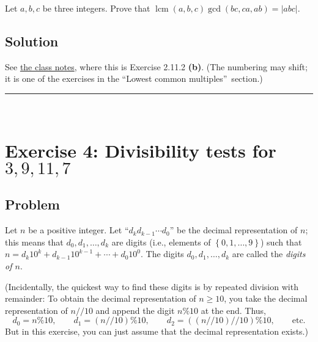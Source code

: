 \documentclass[paper=a4, fontsize=12pt]{scrartcl}%
\theoremstyle{plainsl}
\theoremstyle{definition}
\theoremstyle{remark}
\begin{document}
Let $a, b, c$ be three integers. Prove that $\operatorname{lcm}\left(  a, b, c
\right)  \gcd\left(  bc, ca, ab \right)  = \left|  abc \right|  $.

\subsection{Solution}

See \href{http://www.cip.ifi.lmu.de/~grinberg/t/19s/notes.pdf}{the class
notes}, where this is Exercise 2.11.2 \textbf{(b)}. (The numbering may shift;
it is one of the exercises in the \textquotedblleft Lowest common
multiples\textquotedblright\ section.)

\rule{\linewidth}{0.3pt} \\[0.4cm]

\section{Exercise 4: Divisibility tests for $3, 9, 11, 7$}

\subsection{Problem}

Let $n$ be a positive integer. Let ``$d_{k} d_{k-1} \cdots d_{0}$'' be the
decimal representation of $n$; this means that $d_{0}, d_{1}, \ldots, d_{k}$
are digits (i.e., elements of $\left\{  0, 1, \ldots, 9 \right\}  $) such that
$n = d_{k} 10^{k} + d_{k-1} 10^{k-1} + \cdots+ d_{0} 10^{0}$. The digits
$d_{0}, d_{1}, \ldots, d_{k}$ are called the \textit{digits of $n$}.

(Incidentally, the quickest way to find these digits is by repeated division
with remainder: To obtain the decimal representation of $n \geq10$, you take
the decimal representation of $n // 10$ and append the digit $n \% 10$ at the
end. Thus,
\[
d_{0} = n \% 10, \qquad d_{1} = \left(  n // 10 \right)  \% 10, \qquad d_{2} =
\left(  \left(  n // 10 \right)  // 10 \right)  \% 10, \qquad\text{etc.}
\]
But in this exercise, you can just assume that the decimal representation exists.)
\end{document}
